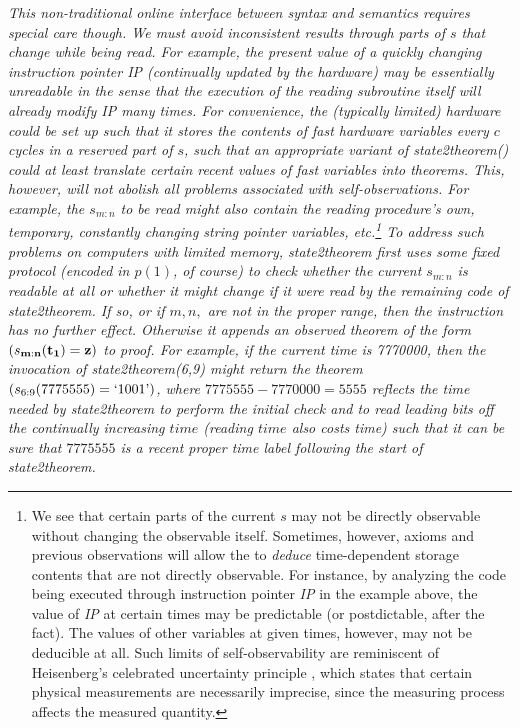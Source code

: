 \begin{enumerate}
{\em
This non-traditional online interface between syntax and semantics
requires special care though.
We must avoid inconsistent results through
parts of $s$ that change while being read.
For example, the present value of a quickly changing
instruction pointer {\em IP} (continually updated by the hardware)
may be essentially unreadable in the
sense that the execution of the reading subroutine
itself will already modify {\em IP} many times.
For convenience, the (typically limited) hardware could be set up
such that it stores the contents of
fast hardware variables every $c$ cycles in
a reserved part of $s$, such that
an appropriate  variant of {\em state2theorem()} could at least
translate certain recent values of fast variables into theorems.
This, however, will not abolish {\em all} problems associated
with self-observations.
For example, the $s_{m:n}$ to be read might
also contain the reading procedure's
own, temporary, constantly changing string pointer variables,
etc.\footnote{We see that certain parts of the
current $s$ may not be directly observable without changing
the observable itself.
Sometimes, however, axioms and previous observations will allow
the \gm to {\em deduce} time-dependent storage contents that
are not directly observable.
For instance, by analyzing the code being executed through
instruction
pointer {\em IP} in the example above,  the value of {\em IP} at
certain times may be predictable (or postdictable, after the
fact).  The values of other variables at given times,
however, may not be deducible at all.
Such limits of self-observability
are reminiscent of Heisenberg's celebrated
uncertainty principle \cite{Heisenberg:25},
which states that certain physical measurements are necessarily
imprecise, since the measuring process affects the measured
quantity.}
To address such problems on computers with limited
memory, {\em state2theorem}
first uses some fixed protocol
(encoded in $p(1)$, of course)
to check whether the current $s_{m:n}$ is readable
at all or whether it might change if it
were read by the remaining code of {\em state2theorem}.
If so, or if $m,n,$ are not in the proper range,
then the instruction has no further effect. Otherwise it
appends an {\em observed} theorem of the form
$(s_{{\bf m}:{\bf n}}({\bf t_1})={\bf z})$
to {\em proof}.
For example, if the current time is 7770000, then the invocation
of {\em state2theorem(6,9)} might return the theorem $(s_{6:9}(7775555)=`1001\textrm{'})$,
where
$7775555-7770000=5555$ reflects the time needed by {\em state2theorem}
to perform the initial check
and to read leading bits off the continually increasing $time$
(reading $time$ also costs time) such that
it can be sure that $7775555$ is a recent proper time label following
the start of {\em state2theorem}.
}

\end{enumerate}

